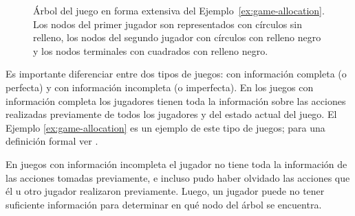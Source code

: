\begin{figure}[h]
\begin{center}
\caption{Árbol del juego en forma extensiva del Ejemplo~\ref{ex:game-allocation}. Los nodos del primer jugador son representados con círculos sin relleno, los nodos del segundo jugador con círculos con relleno negro y los nodos terminales con cuadrados con relleno negro.}
\label{fig:game-allocation}
\end{center}
\end{figure}

Es importante diferenciar entre dos tipos de juegos: con información completa (o perfecta) y con información incompleta (o imperfecta). En los juegos con información completa los jugadores tienen toda la información sobre las acciones realizadas previamente de todos los jugadores y del estado actual del juego. El Ejemplo \ref{ex:game-allocation} es un ejemplo de este tipo de juegos; para una definición formal ver \cite[pp. 89--90]{bib:course-game-theory}.

En juegos con información incompleta el jugador no tiene toda la información de las acciones tomadas previamente, e incluso pudo haber olvidado las acciones que él u otro jugador realizaron previamente. 
Luego, un jugador puede no tener suficiente información para determinar en qué nodo del árbol se encuentra. 

